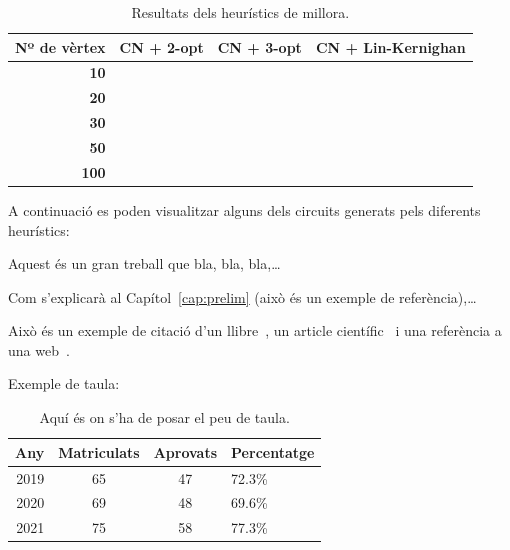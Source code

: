 \documentclass[a4paper,12pt,twoside]{ThesisStyle}
\begin{document}
\begin{table}[htb]
  \centering
  \begin{tabular}{ | r | c | c | c | }
   \hline
   \textbf{Nº de vèrtex} & \textbf{CN + 2-opt} & \textbf{CN + 3-opt} & \textbf{CN + Lin-Kernighan} \\
   \hline
   \textbf{10}  &  &  &  \\
   \textbf{20}  &  &  &  \\
   \textbf{30}  &  &  &  \\
   \textbf{50}  &  &  &  \\
   \textbf{100} &  &  &  \\
   \hline
  \end{tabular}
  \caption{Resultats dels heurístics de millora.}
  \label{taula:heuristicsMillora}
\end{table}

\medskip

A continuació es poden visualitzar alguns dels circuits generats pels diferents heurístics:



  

















\newpage





















Aquest és un gran treball que bla, bla, bla,\ldots

Com s'explicarà al Capítol~\ref{cap:prelim} (això és un exemple de referència),\ldots

Això és un exemple de citació d'un llibre~\cite{Coleman1974}, un article científic~\cite{Ruiz2008} i una referència a una web~\cite{Halcon}.

Exemple de taula:
\begin{table}[htb]
\centering
\begin{tabular}{ | r | c | c | l | }
 \hline
  Any & Matriculats & Aprovats & Percentatge\\
\hline
 2019  & 65 & 47 & 72.3\%\\
 2020  & 69 & 48 & 69.6\%\\
 2021  & 75 & 58 & 77.3\%\\
  \hline
  \end{tabular}
\caption{Aquí és on s'ha de posar el peu de taula.}
\label{taula:taulaexemple} 
\end{table}
\end{document}
